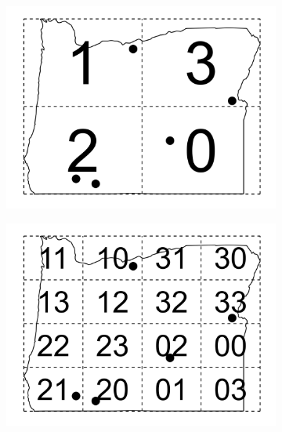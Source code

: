\documentclass[
  shortnames]{jss}
\begin{document}
\begin{figure}
\centering
\begin{subfigure}{0.45\textwidth}
  \centering
  \includegraphics[width = 1\linewidth]{images/grts_level1.jpeg}
  \caption{}
  \label{fig:grts_level1}
\end{subfigure}
\begin{subfigure}{0.45\textwidth}
  \centering
  \includegraphics[width = 1\linewidth]{images/grts_level2.jpeg}
  \caption{}
  \label{fig:grts_level2}
\end{subfigure} \\
\begin{subfigure}{0.45\textwidth}
  \centering

\end{subfigure}
\end{figure}
\end{document}
